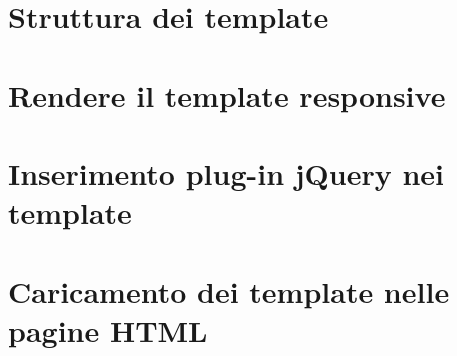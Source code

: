 \section{Struttura dei template}

\section{Rendere il template responsive}

\section{Inserimento plug-in jQuery nei template}

\section{Caricamento dei template nelle pagine HTML}

